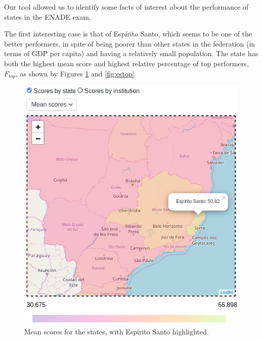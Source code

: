 \documentclass{vgtc}                          %
\begin{document}
Our tool allowed us to identify some facts of interest about the performance of states in the ENADE exam.

The first interesting case is that of Espírito Santo, which seems to be one of the better performers, in spite of being poorer than other states in the federation (in terms of GDP per capita) \cite{ibgepib} and having a relatively small population. The state has both the highest mean score and highest relative percentage of top performers, $F_{top}$, as shown by Figures \ref{fig:esmean} and \ref{fig:estop} 

\begin{figure}
	\centering
	\includegraphics[width=\columnwidth]{figures/es_mean.png}
	\caption{Mean scores for the states, with Espírito Santo highlighted.}
	\label{fig:esmean}
\end{figure}
\end{document}
